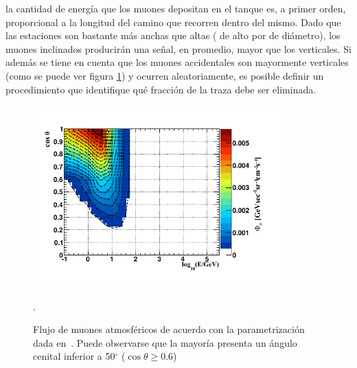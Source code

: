 		 la cantidad de energía que los muones depositan en el tanque es, a primer orden, proporcional a la longitud del camino que recorren dentro del mismo.
		Dado que las estaciones son bastante más anchas que altas ( de alto por  de diámetro), los muones inclinados producir\'an una señal, en promedio, mayor que los verticales.
		Si adem\'as se tiene en cuenta que los muones accidentales son mayormente verticales (como se puede ver figura \ref{fig:atmo_mu_flux}) y ocurren aleatoriamente, es posible definir un procedimiento que identifique qué fracción de la traza debe ser eliminada.
		\begin{figure}[ht]
		\begin{center}
		\includegraphics[width=0.85\textwidth]{fig/seleccionAuger/atmo_mu_flux.pdf}
		\caption{Flujo de muones atmosféricos de acuerdo con la parametrización dada en~\cite{cite:atmo_mu}. Puede observarse que la mayoría presenta un ángulo cenital inferior a 50$^{\circ}$ ($\cos\theta \geqslant 0.6$)}.
		\label{fig:atmo_mu_flux}
		\end{center}
		\end{figure}
		
